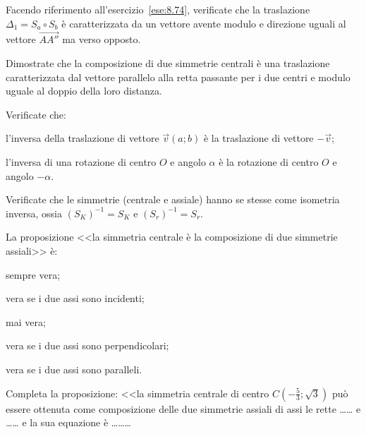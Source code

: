 \begin{esercizio}
\label{ese:8.75} %
Facendo riferimento all'esercizio~\ref{ese:8.74}, verificate che la 
traslazione $\Delta_1 = S_a \circ S_b$ è caratterizzata da un vettore 
avente modulo e direzione uguali al vettore $\overrightarrow{AA''}$ 
ma verso opposto.
\end{esercizio}


\begin{esercizio}
\label{ese:8.79} %
Dimostrate che la composizione di due simmetrie centrali è una 
traslazione caratterizzata dal vettore parallelo alla retta passante 
per i due centri e modulo uguale al doppio della loro distanza.
\end{esercizio}


\begin{esercizio}
\label{ese:8.82} %
Verificate che:
\begin{enumeratea}
\item l'inversa della traslazione di vettore $\vec{v}(a;b)$ è la 
traslazione di vettore $-\vec{v}$;
\item l'inversa di una rotazione di centro $O$ e angolo $\alpha$ è la 
rotazione di centro $O$ e angolo $-\alpha$.
\end{enumeratea}
\end{esercizio}

\begin{esercizio}
\label{ese:8.83} %
Verificate che le simmetrie (centrale e assiale) hanno se stesse come 
isometria inversa, ossia $(S_K)^{-1}=S_K$ e $(S_r)^{-1}=S_r$.
\end{esercizio}

\begin{esercizio}
\label{ese:8.84} %
La proposizione <<la simmetria centrale è la composizione di due 
simmetrie assiali>> è:
\begin{enumeratea}
\item sempre vera;
\item vera se i due assi sono incidenti;
\item mai vera;
\item vera se i due assi sono perpendicolari;
\item vera se i due assi sono paralleli.
\end{enumeratea}
\end{esercizio}

\begin{esercizio}
\label{ese:8.85} %
Completa la proposizione: <<la simmetria centrale di centro 
$C\left(-\frac{5}{3};\sqrt{3}\right)$ può essere ottenuta come 
composizione delle due simmetrie assiali di assi le rette 
\ldots\ldots{} e \ldots\ldots{} e la sua equazione è 
\ldots\ldots\ldots{}
\end{esercizio}

